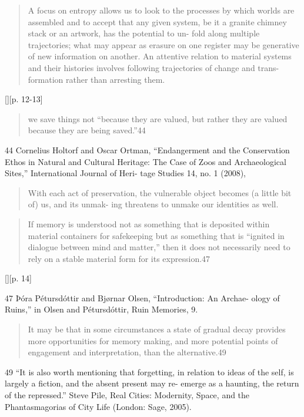 \begin{quotation}
    A focus on entropy allows us to look to the processes by which worlds are
    assembled and to accept that any given system, be it a granite chimney stack
    or an artwork, has the potential to un- fold along multiple trajectories;
    what may appear as erasure on one register may be generative of new
    information on another. An attentive relation to material systems and their
    histories involves following trajectories of change and trans- formation
    rather than arresting them.
\end{quotation} [][p. 12-13]

\begin{quotation}
    we save things not “because they are valued, but rather they are valued
    because they are being saved.”44
\end{quotation}

44 Cornelius Holtorf and Oscar Ortman, “Endangerment and the Conservation Ethos
in Natural and Cultural Heritage: The Case of Zoos and Archaeological Sites,”
International Journal of Heri- tage Studies 14, no. 1 (2008), 

\begin{quotation}
    With each act of preservation, the vulnerable object becomes (a little bit
    of) us, and its unmak- ing threatens to unmake our identities as well.
\end{quotation}

\begin{quotation}
    If memory is understood not as something that is deposited within material
    containers for safekeeping but as something that is “ignited in dialogue
    between mind and matter,” then it does not necessarily need to rely on a
    stable material form for its expression.47
\end{quotation}[][p. 14]

47 Þóra Pétursdóttir and Bjørnar Olsen, “Introduction: An Archae- ology of
Ruins,” in Olsen and Pétursdóttir, Ruin Memories, 9.

\begin{quotation}
    It may be that in some circumstances a state of gradual decay provides more
    opportunities for memory making, and more potential points of engagement and
    interpretation, than the alternative.49
\end{quotation}


49 ``It is also worth mentioning that forgetting, in relation to ideas of the
self, is largely a fiction, and the absent present may re- emerge as a haunting,
the return of the repressed.'' Steve Pile, Real Cities: Modernity, Space, and
the Phantasmagorias of City Life (London: Sage, 2005).


